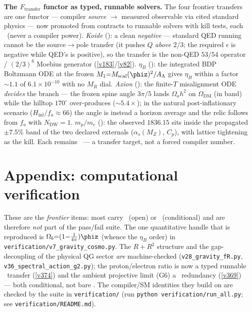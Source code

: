 \par\smallskip\noindent\textbf{The $F_{\mathrm{transfer}}$ functor as typed, runnable solvers.} The four
frontier transfers are one functor --- compiler \emph{source} $\to$ measured observable via cited standard
physics --- now promoted from contracts to runnable solvers with kill tests, each \mC\ (never a compiler
power). \emph{Koide} (): a clean \emph{negative} --- standard QED running cannot
be the source$\to$pole transfer (it pushes $Q$ \emph{above} $2/3$; the required $\epsilon$ is negative while
QED's is positive), so the transfer is the non-QED $53/54$ operator / $(2/3)^6$ Moebius generator
(\vref{v183}/\vref{v82}). \emph{$\eta_B$} (): the integrated BDP Boltzmann
ODE at the frozen $M_1{=}M_{\mathrm{scal}}(\phiz)^2/A_\Lambda$ gives $\eta_B$ within a factor ${\sim}1.1$ of
$6.1{\times}10^{-10}$ with no $M_R$ dial. \emph{Axion} (): the finite-$T$
misalignment ODE \emph{decides} the branch --- the frozen spine angle $3\pi/5$ lands $\Omega_a h^2$ on
$\Omega_{\mathrm{DM}}$ (in band) while the hilltop $170^\circ$ over-produces (${\sim}5.4\times$); in the
natural post-inflationary scenario ($H_{\mathrm{inf}}/f_a{\approx}66$) the angle is instead a horizon
average and the relic follows from $f_a$ with $N_{\mathrm{DW}}{=}1$.
\emph{$m_p/m_e$} (): the observed $1836.15$ sits inside the propagated
${\pm}7.5\%$ band of the two declared externals ($\alpha_s(M_Z)$, $C_p$), with lattice tightening as the kill.
Each remains \mC\ --- a transfer target, not a forced compiler number.



\section*{Appendix: computational verification}
These are the \emph{frontier} items: most carry \mO\ (open) or \mC\ (conditional) and are therefore
\emph{not} part of the pass/fail suite. The one quantitative handle that is reproduced is
$\Omega_b{=}(1{-}\tfrac1{4\pi})\phiz$ (whence the $\eta_B$ order) in
\texttt{verification/v7\_gravity\_cosmo.py}. The $R+R^2$ structure and the gap-decoupling of the physical
QG sector \emph{are} machine-checked (\texttt{v28\_gravity\_fR.py}, \texttt{v36\_spectral\_action\_g2.py}); the
proton/electron ratio is now a typed runnable \mC\ transfer (\vref{v374}) and the ambient projective limit (G6) a
\mC\ redundancy (\vref{v369}) --- both conditional, not bare \mO. The compiler/SM
identities they build on are checked by the suite in \texttt{verification/} (run
\texttt{python verification/run\_all.py}; see \texttt{verification/README.md}).




